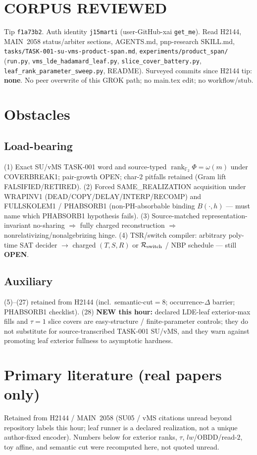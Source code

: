 \documentclass[11pt]{article}
\begin{document}
\section*{CORPUS REVIEWED}
Tip \texttt{f1a73b2}. Auth identity \texttt{j15marti} (user-GitHub-xai \texttt{get\_me}).
Read H2144, MAIN~2058 status/arbiter sections, AGENTS.md, pnp-research SKILL.md,
\texttt{tasks/TASK-001-su-vms-product-span.md}, \texttt{experiments/product\_span/}
(\texttt{run.py}, \texttt{vms\_lde\_hadamard\_leaf.py}, \texttt{slice\_cover\_battery.py},
\texttt{leaf\_rank\_parameter\_sweep.py}, README).
Surveyed commits since H2144 tip: \textbf{none}.
No peer overwrite of this GROK path; no main.tex edit; no workflow/stub.

\section*{Obstacles}
\subsection*{Load-bearing}
(1) Exact SU/vMS TASK-001 word and source-typed
$\operatorname{rank}_{\mathbb F_2}\Phi=\omega(m)$ under COVERBREAK1; pair-growth OPEN;
char-$2$ pitfalls retained (Gram lift FALSIFIED/RETIRED).
(2) Forced SAME\_REALIZATION acquisition under WRAPINV1
(DEAD/COPY/DELAY/INTERP/RECOMP) and FULLSKOLEM1 / PHABSORB1
(non-PH-absorbable binding $B(\cdot,h)$ --- must name which PHABSORB1 hypothesis fails).
(3) Source-matched representation-invariant no-sharing $\Rightarrow$ fully charged reconstruction
$\Rightarrow$ nonrelativizing/nonalgebrizing hinge.
(4) TSR/switch compiler: arbitrary poly-time SAT decider $\to$ charged $(T,S,R)$ or
$\mathcal R_{\rm switch}$ / NBP schedule --- still \textbf{OPEN}.

\subsection*{Auxiliary}
(5)--(27) retained from H2144 (incl.\ semantic-cut$=8$; occurrence-$\Delta$ barrier;
PHABSORB1 checklist).
(28) \textbf{NEW this hour:} declared LDE-leaf exterior-max fills and $\tau{=}1$ slice covers
are easy-structure / finite-parameter controls; they do not substitute for source-transcribed
TASK-001 SU/vMS, and they warn against promoting leaf exterior fullness to asymptotic hardness.

\section*{Primary literature (real papers only)}
Retained from H2144 / MAIN~2058 (SU05 / vMS citations unread beyond repository labels this hour;
leaf runner is a declared realization, not a unique author-fixed encoder).
Numbers below for exterior ranks, $\tau$, $lw$/OBDD/read-$2$, toy affine, and semantic cut
were recomputed here, not quoted unread.
\end{document}
